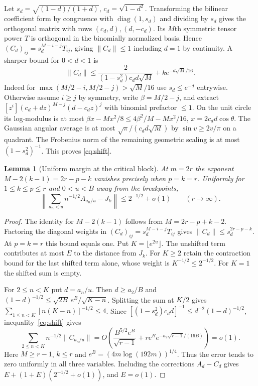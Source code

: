 \documentclass[11pt,a4paper,reqno]{amsart}
\newtheorem{lemma}[theorem]{Lemma}
\numberwithin{equation}{section}
\begin{document}
Let \(s_d=\sqrt{(1-d)/(1+d)}\), \(c_d=\sqrt{1-d^2}\). Transforming the bilinear coefficient form by congruence with \(\operatorname{diag}(1,s_d)\) and dividing by \(s_d\) gives the orthogonal matrix with rows \((c_d,d),(d,-c_d)\). Its \(M\)th symmetric tensor power \(T\) is orthogonal in the binomially normalized basis. Hence \((C_d)_{ij}=s_d^{M-i-j}T_{ij}\), giving \(\|C_d\|\le1\) including \(d=1\) by continuity. A sharper bound for \(0<d<1\) is 
\begin{equation}\label{eq:shift}
\|C_d\|\le \frac{2}{(1-s_d^2)c_d d\sqrt M}+k e^{-d\sqrt M/16}.
\end{equation}
 Indeed for \(\max(M/2-i,M/2-j)>\sqrt M/16\) use \(s_d\le e^{-d}\) entrywise. Otherwise assume \(i\ge j\) by symmetry, write \(\beta=M/2-j\), and extract \([z^i](c_d+dz)^{M-j}(d-c_dz)^j\) with binomial prefactor \(\le1\). On the unit circle its log-modulus is at most \(\beta x-Mx^2/8\le4\beta^2/M-Mx^2/16\), \(x=2c_d d\cos\theta\). The Gaussian angular average is at most \(\sqrt{\pi}/(c_d d\sqrt M)\) by \(\sin v\ge 2v/\pi\) on a quadrant. The Frobenius norm of the remaining geometric scaling is at most \((1-s_d^2)^{-1}\). This proves \eqref{eq:shift}.

\begin{lemma}[Uniform margin at the critical block]\label{lem:critical}
At \(m=2r\) the exponent \(M-2(k-1)=2r-p-k\) vanishes precisely when \(p=k=r\). Uniformly for \(1\le k\le p\le r\) and \(0<u<B\) away from the breakpoints,
\[
 \left\|\sum_{a_n<u} n^{-1/2} A_{a_n/u}-J_k\right\|
 \le 2^{-1/2}+o(1) \qquad(r\to\infty).
\]
\end{lemma}
\begin{proof}
The identity for \(M-2(k-1)\) follows from \(M=2r-p+k-2\). Factoring the diagonal weights in \((C_d)_{ij}=s_d^{M-i-j}T_{ij}\) gives \(\|C_d\|\le s_d^{2r-p-k}\). At \(p=k=r\) this bound equals one. Put \(K=\lfloor e^{2u}\rfloor\). The unshifted term contributes at most \(E\) to the distance from \(J_k\). For \(K\ge2\) retain the contraction bound for the last shifted term alone, whose weight is \(K^{-1/2}\le2^{-1/2}\). For \(K=1\) the shifted sum is empty.

For \(2\le n<K\) put \(d=a_n/u\). Then \(d\ge a_2/B\) and \((1-d)^{-1/2}\le\sqrt{2B}\,e^B/\sqrt{K-n}\). Splitting the sum at \(K/2\) gives \(\sum_{1\le n<K}[n(K-n)]^{-1/2}\le4\). Since \([(1-s_d^2)c_dd]^{-1}\le d^{-2}(1-d)^{-1/2}\), inequality~\eqref{eq:shift} gives
\[
 \sum_{2\le n<K} n^{-1/2}\|C_{a_n/u}\|
 =O\!\left(\frac{B^{5/2}e^B}{\sqrt{r-1}}
       +re^B e^{-a_2\sqrt{r-1}/(16B)}\right)=o(1).
\]
Here \(M\ge r-1\), \(k\le r\) and \(e^B=(4m\log(192m))^{1/4}\). Thus the error tends to zero uniformly in all three variables. Including the corrections \(A_d-C_d\) gives \(E+(1+E)(2^{-1/2}+o(1))\), and \(E=o(1)\).
\end{proof}
\end{document}
